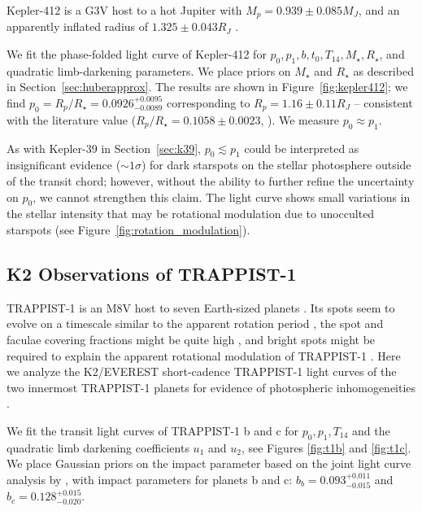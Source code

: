 Kepler-412 is a G3V host to a hot Jupiter with $M_p = 0.939 \pm 0.085 M_J$, and an apparently inflated radius of $1.325 \pm 0.043 R_J$ \citep{Deleuil2014}. 

We fit the phase-folded \kepler light curve of Kepler-412 for $p_0, p_1, b, t_0, T_{14}, M_\star, R_\star$, and quadratic limb-darkening parameters. We place priors on $M_\star$ and $R_\star$ as described in Section~\ref{sec:huberapprox}. The results are shown in Figure~\ref{fig:kepler412}; we find $p_0 = R_p/R_\star = 0.0926_{-0.0089}^{+0.0095}$ corresponding to $R_p = 1.16 \pm 0.11 R_J$ -- consistent with the literature value ($R_p/R_\star = 0.1058 \pm 0.0023$, \citealt{Deleuil2014}). We measure $p_0 \approx p_1$. 

As with Kepler-39 in Section~\ref{sec:k39}, $p_0 \lesssim p_1$ could be interpreted as insignificant evidence ($\sim 1 \sigma$) for dark starspots on the stellar photosphere outside of the transit chord;  however, without the ability to further refine the uncertainty on $p_0$, we cannot strengthen this claim. The \kepler light curve shows small variations in the stellar intensity that may be rotational modulation due to unocculted starspots (see Figure~\ref{fig:rotation_modulation}).


\subsection{K2 Observations of TRAPPIST-1}

TRAPPIST-1 is an M8V host to seven Earth-sized planets \citep{Gillon2016,Gillon2017,Luger2017,Delrez2018}. Its spots seem to evolve on a timescale similar to the apparent rotation period \citep{Roettenbacher2017}, the spot and faculae covering fractions might be quite high \citep{Rackham2018,Zhang2018}, and bright spots might be required to explain the apparent rotational modulation of TRAPPIST-1 \citep{Morris2018c}. Here we analyze the K2/EVEREST short-cadence TRAPPIST-1 light curves of the two innermost TRAPPIST-1 planets for evidence of photospheric inhomogeneities \citep{Luger2016, luger2017everest}.

We fit the transit light curves of TRAPPIST-1 b and c for $p_0, p_1, T_{14}$ and the quadratic limb darkening coefficients $u_1$ and $u_2$, see Figures \ref{fig:t1b} and \ref{fig:t1c}. We place Gaussian priors on the impact parameter based on the joint light curve analysis by \citep{Luger2017}, with impact parameters for planets b and c: $b_b = {0.093}_{-0.015}^{+0.011}$ and
$b_c = {0.128}_{-0.020}^{+0.015}$. 

